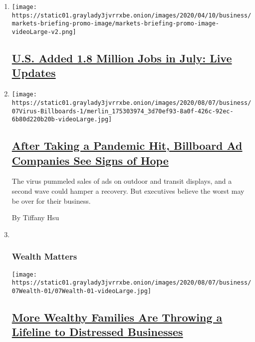 \begin{enumerate}
\def\labelenumi{\arabic{enumi}.}
\item
  \texttt{[image: https://static01.graylady3jvrrxbe.onion/images/2020/04/10/business/markets-briefing-promo-image/markets-briefing-promo-image-videoLarge-v2.png]}

  \hypertarget{us-added-18-million-jobs-in-july-live-updates}{%
  \subsection{\texorpdfstring{\href{https://www.nytimes3xbfgragh.onion/live/2020/08/07/business/stock-market-today-coronavirus}{U.S.
  Added 1.8 Million Jobs in July: Live
  Updates}}{U.S. Added 1.8 Million Jobs in July: Live Updates}}\label{us-added-18-million-jobs-in-july-live-updates}}
\item
  \texttt{[image: https://static01.graylady3jvrrxbe.onion/images/2020/08/07/business/07Virus-Billboards-1/merlin\_175303974\_3d70ef93-8a0f-426c-92ec-6b80d220b20b-videoLarge.jpg]}

  \hypertarget{after-taking-a-pandemic-hit-billboard-ad-companies-see-signs-of-hope}{%
  \subsection{\texorpdfstring{\href{/2020/08/07/business/media/billboard-advertising-pandemic.html}{After
  Taking a Pandemic Hit, Billboard Ad Companies See Signs of
  Hope}}{After Taking a Pandemic Hit, Billboard Ad Companies See Signs of Hope}}\label{after-taking-a-pandemic-hit-billboard-ad-companies-see-signs-of-hope}}

  The virus pummeled sales of ads on outdoor and transit displays, and a
  second wave could hamper a recovery. But executives believe the worst
  may be over for their business.

  By Tiffany Hsu
\item ~
  \hypertarget{wealth-matters}{%
  \subsubsection{Wealth Matters}\label{wealth-matters}}

  \texttt{[image: https://static01.graylady3jvrrxbe.onion/images/2020/08/07/business/07Wealth-01/07Wealth-01-videoLarge.jpg]}

  \hypertarget{more-wealthy-families-are-throwing-a-lifeline-to-distressed-businesses}{%
  \subsection{\texorpdfstring{\href{/2020/08/07/your-money/family-office-direct-investment.html}{More
  Wealthy Families Are Throwing a Lifeline to Distressed
  Businesses}}{More Wealthy Families Are Throwing a Lifeline to Distressed Businesses}}\label{more-wealthy-families-are-throwing-a-lifeline-to-distressed-businesses}}


\end{enumerate}
